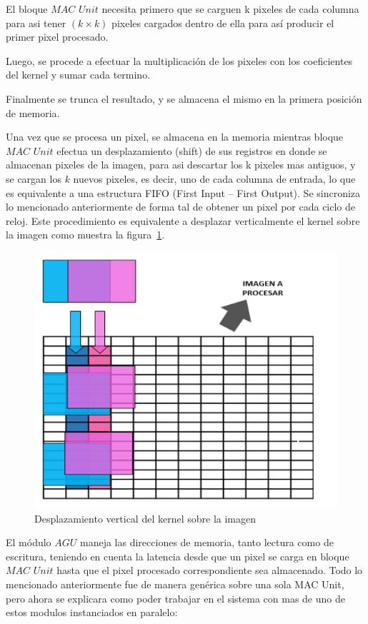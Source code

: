 El bloque $MAC$ $Unit$ necesita primero que se carguen k pixeles de cada
columna para asi tener $(k \times k)$ pixeles cargados dentro de ella para así
producir el primer pixel procesado.

Luego, se procede a efectuar la multiplicación de los pixeles con los coeficientes del kernel y sumar cada termino.

Finalmente se trunca el resultado, y se almacena el mismo en la primera posición de memoria.

Una vez que se procesa un pixel, se almacena en la memoria mientras bloque $MAC$  $Unit$ efectua un desplazamiento (shift) de sus registros en donde se almacenan pixeles de la imagen, para asi descartar los k pixeles mas antiguos,
 y se cargan los $k$ nuevos pixeles, es decir, uno de cada columna de entrada, lo que es equivalente a una estructura FIFO (First Input – First Output).
Se sincroniza lo mencionado anteriormente de forma tal de obtener un pixel por
cada ciclo de reloj. Este procedimiento es equivalente a desplazar verticalmente
el kernel sobre la imagen como muestra la figura~\ref{verticaldesp}.

\begin{figure}
\centering
\includegraphics[scale=0.7]{conv1_despl.png}
\caption{Desplazamiento vertical del kernel sobre la imagen }
\label{verticaldesp}
\end{figure}

El módulo $AGU$ maneja las direcciones de memoria, tanto lectura como de escritura, teniendo en cuenta la latencia desde que un pixel se carga en bloque $MAC$ $Unit$ hasta que el pixel procesado correspondiente sea almacenado.
Todo lo mencionado anteriormente fue de manera genérica sobre una sola MAC Unit, pero ahora se explicara como poder trabajar en el sistema con mas de uno de estos modulos instanciados en paralelo:

